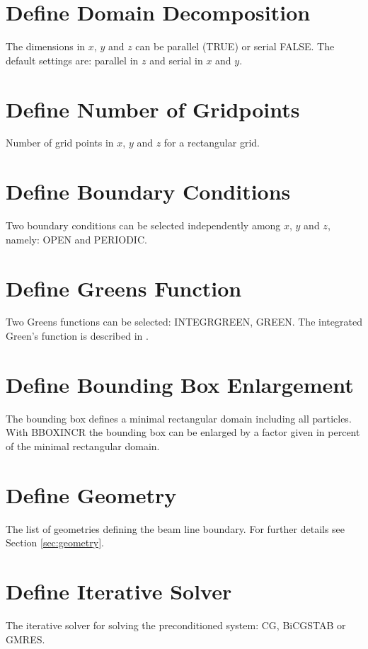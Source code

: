 \section{Define Domain Decomposition}
\label{sec:FSDomDEC}
The dimensions in  $x$, $y$ and $z$ can be parallel (TRUE)  or serial FALSE. The
default settings are: parallel in $z$ and serial in $x$ and $y$. 

\section{Define Number of Gridpoints}
\label{sec:FSMX}
Number of grid points in $x$, $y$ and $z$ for a rectangular grid.

\section{Define Boundary Conditions}
\label{sec:FSBC}
Two boundary conditions can be selected independently among $x$, $y$ and $z$, namely:  OPEN and PERIODIC. 

\section{Define Greens Function}
\label{sec:FSGREEN}
Two Greens functions can be selected: INTEGRGREEN, GREEN. The integrated Green's function is described in \cite{qiang2005}. 

\section{Define Bounding Box Enlargement}
\label{sec:FSBBOX}
The bounding box defines a minimal rectangular domain including all particles. With BBOXINCR 
the bounding box can be enlarged by a factor given in percent of the minimal rectangular domain.

\section{Define Geometry}
\label{sec:GEOMETRY}
The list of geometries defining the beam line boundary. For further details see Section \ref{sec:geometry}.

\section{Define Iterative Solver}
\label{sec:ITSOLVER}
The iterative solver for solving the preconditioned system: CG, BiCGSTAB or GMRES.

